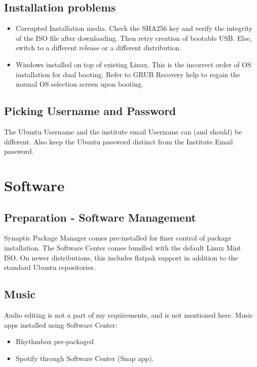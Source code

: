 \documentclass[8pt,letterpaper,twocolumn]{article}
\begin{document}
\subsection{Installation problems}

\begin{itemize}
	\item Corrupted Installation media. Check the SHA256 key and verify the integrity of the ISO file after downloading.
	Then retry creation of bootable USB. Else, switch to a different release or a different distribution.
	\item Windows installed on top of existing Linux.
	This is the incorrect order of OS installation for dual booting.
	Refer to GRUB Recovery help to regain the normal OS selection screen upon booting.
\end{itemize}

\subsection{Picking Username and Password}
The Ubuntu Username and the institute email Username can (and should) be different.
Also keep the Ubuntu password distinct from the Institute Email password.

\newpage

\section{Software}
\subsection{Preparation - Software Management}

Synaptic Package Manager comes pre-installed for finer control of package installation.
The Software Center comes bundled with the default Linux Mint ISO.
On newer distributions, this includes flatpak support in addition to the standard Ubuntu repositories.

\subsection{Music}

Audio editing is not a part of my requirements, and is not mentioned here.
Music apps installed using Software Center:

\begin{itemize}
	\item Rhythmbox pre-packaged
	\item Spotify through Software Center (Snap app).
\end{itemize}
\end{document}
